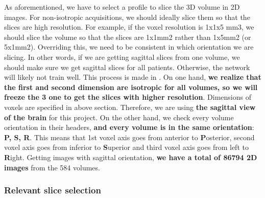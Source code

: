 As aforementioned, we have to select a profile to slice the 3D volume in 2D images. For non-isotropic acquisitions, we should ideally slice them so that the slices are high resolution. For example, if the voxel resolution is 1x1x5 mm3, we should slice the volume so that the slices are 1x1mm2 rather than 1x5mm2 (or 5x1mm2). Overriding this, we need to be consistent in which orientation we are slicing. In other words, if we are getting sagittal slices from one volume, we should make sure we get sagittal slices for all patients. Otherwise, the network will likely not train well. This process is made in . On one hand, \textbf{we realize that the first and second dimension are isotropic for all volumes, so we will freeze the 3 one to get the slices with higher resolution}. Dimensions of voxels are specified in above section. Therefore, we are using \textbf{the sagittal view of the brain} for this project. On the other hand, we check every volume orientation in their headers, \textbf{and every volume is in the same orientation}: \textbf{P, S, R}. This means that 1st voxel axis goes from anterior to \textbf{P}osterior, second voxel axis goes from inferior to \textbf{S}uperior and third voxel axis goes from left to \textbf{R}ight. Getting images with sagittal orientation, \textbf{we have a total of 86794 2D images} from the 584 volumes.

\subsubsection{Relevant slice selection}
\label{subsubsection:relevantsliceselection}

